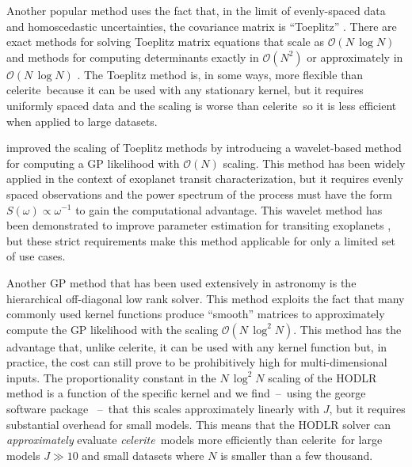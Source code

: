 \documentclass[manuscript, letterpaper]{aastex6}
\newcommand{\project}[1]{\textsf{#1}}
\newcommand{\celerite}{\project{celerite}}
\newcommand{\celeriteterm}{\emph{celerite}}
\renewcommand{\eqref}[1]{\ref{eq:#1}}
\newcommand{\Eq}[1]{Equation~(\eqref{#1})}
\newcommand{\eq}[1]{\Eq{#1}}
\begin{document}

Another popular method uses the fact that, in the limit of evenly-spaced data
and homoscedastic uncertainties, the covariance matrix is ``Toeplitz''
\citep[for example][]{Dillon:2013}.
There are exact methods for solving Toeplitz matrix equations that scale as
$\mathcal{O}(N\,\log N)$ and methods for computing determinants exactly in
$\mathcal{O}(N^2)$ or approximately in $\mathcal{O}(N\,\log N)$
\citep{Wilson:2014}.
The Toeplitz method is, in some ways, more flexible than \celerite\ because it
can be used with any stationary kernel, but it requires uniformly spaced data
and the scaling is worse than \celerite\ so it is less efficient when applied
to large datasets.

\citet{Carter:2009} improved the scaling of Toeplitz methods by introducing a
wavelet-based method for computing a GP likelihood with $\mathcal{O}(N)$
scaling.
This method has been widely applied in the context of exoplanet transit
characterization, but it requires evenly spaced observations and the power
spectrum of the process must have the form $S(\omega)\propto \omega^{-1}$ to
gain the computational advantage.
This wavelet method has been demonstrated to improve parameter estimation for
transiting exoplanets \citep{Carter:2009}, but these strict requirements make
this method applicable for only a limited set of use cases.


Another GP method that has been used extensively in astronomy is the
hierarchical off-diagonal low rank \citep[HODLR,][]{Ambikasaran:2016} solver.
This method exploits the fact that many commonly used kernel functions produce
``smooth'' matrices to approximately compute the GP likelihood with the
scaling $\mathcal{O}(N\,\log^2 N)$.
This method has the advantage that, unlike \celerite, it can be used with any
kernel function but, in practice, the cost can still prove to be prohibitively
high for multi-dimensional inputs.
The proportionality constant in the $N\,\log^2N$ scaling of the HODLR method
is a function of the specific kernel and we find~--~using the \project{george}
software package \citep{Foreman-Mackey:2014, Ambikasaran:2016}~--~that this
scales approximately linearly with $J$, but it requires substantial overhead
for small models.
This means that the HODLR solver can \emph{approximately} evaluate
\celeriteterm\
models more efficiently than \celerite\ for large models $J \gg 10$ and
small datasets where $N$ is smaller than a few thousand.
\end{document}

